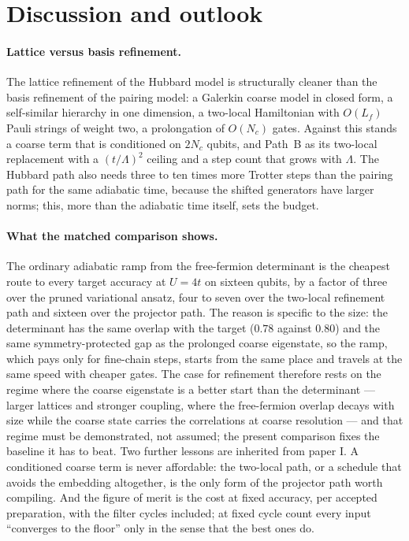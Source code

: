 \documentclass[
  aps,
  prc,
  reprint,
  superscriptaddress,
  floatfix,
  nofootinbib
]{revtex4-2}
\begin{document}
\section{Discussion and outlook}
\label{sec:discussion}
\paragraph{Lattice versus basis refinement.}
The lattice refinement of the Hubbard model is structurally cleaner than the
basis refinement of the pairing model: a Galerkin coarse model in closed
form, a self-similar hierarchy in one dimension, a two-local Hamiltonian
with $O(L_f)$ Pauli strings of weight two, a prolongation of $O(N_c)$ gates.
Against this stands a coarse term that is conditioned on $2N_c$ qubits, and
Path~B as its two-local replacement with a $(t/\Lambda)^2$ ceiling and a
step count that grows with $\Lambda$.  The Hubbard path also needs three to
ten times more Trotter steps than the pairing path for the same adiabatic
time, because the shifted generators have larger norms; this, more than the
adiabatic time itself, sets the budget.

\paragraph{What the matched comparison shows.}
The ordinary adiabatic ramp from the free-fermion determinant is the
cheapest route to every target accuracy at $U=4t$ on sixteen qubits, by a
factor of three over the pruned variational ansatz, four to seven over the
two-local refinement path and sixteen over the projector path.  The reason
is specific to the size: the determinant has the same overlap with the
target ($0.78$ against $0.80$) and the same symmetry-protected gap as the
prolonged coarse eigenstate, so the ramp, which pays only for fine-chain
steps, starts from the same place and travels at the same speed with
cheaper gates.  The case for refinement therefore rests on the regime
where the coarse eigenstate is a better start than the determinant ---
larger lattices and stronger coupling, where the free-fermion overlap
decays with size while the coarse state carries the correlations at coarse
resolution --- and that regime must be demonstrated, not assumed; the
present comparison fixes the baseline it has to beat.  Two further
lessons are inherited from paper I.  A conditioned coarse term is never
affordable: the two-local path, or a schedule that avoids the embedding
altogether, is the only form of the projector path worth compiling.  And
the figure of merit is the cost at fixed accuracy, per accepted
preparation, with the filter cycles included; at fixed cycle count every
input ``converges to the floor'' only in the sense that the best ones do.
\end{document}
